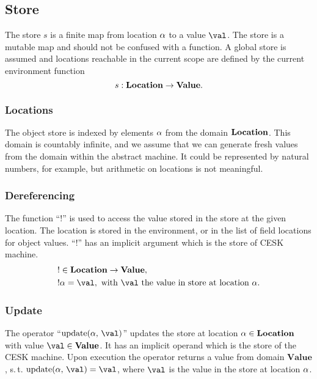\documentclass[a4paper,oneside,fleqn]{article}
\DeclareMathOperator{\update}{update}
\newcommand{\dval}{\mathbf{Value}}
\begin{document}
\subsection{Store}
\label{subsec:store-definition}

The store $s$ is a finite map from location $\alpha$ to a value $\val$.
The store is a mutable map and should not be confused with a function.
A global store is assumed and locations reachable in the current scope are defined by the current environment function
\[
    s : \dlocation \rightarrow \dval.
\]


\subsubsection{Locations}

The object store is indexed by elements $\alpha$ from the domain $\mathbf{Location}$.
This domain is countably infinite, and we assume that we can generate fresh values from the domain within the abstract machine.
It could be represented by natural numbers, for example, but arithmetic on locations is not meaningful.


\subsubsection{Dereferencing}
\label{subsubsection:dereferecing}

\newcommand{\deref}[1]{!#1}
The function ``$\deref{}$'' is used to access the value stored in the store at the given location.
The location is stored in the environment, or in the list of field locations for object values.
``$\deref{}$'' has an implicit argument which is the store of CESK machine.
\begin{align*}
    &\deref{} \in \dlocation \rightarrow \dval,\\
    &\deref{\loc} =  \val, \text{ with $\val$ the value in store at location } \loc.
\end{align*}


\subsubsection{Update}
\label{subsubsec:store-update}

The operator ``$\update(\loc,\, \val)$'' updates the store at location $\alpha \in \mathbf{Location}$ with value $\val \in \dval$.
It has an implicit operand which is the store of the CESK machine.
Upon execution the operator returns a value from domain $\dval$, s.\,t. $\update(\loc,\,\val) = \val$, where $\val$ is the value in the store at location $\alpha$.
\end{document}
